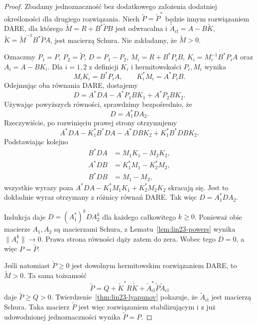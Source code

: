 \begin{proof}
Zbadamy jednoznaczność
bez dodatkowego założenia
dodatniej określoności
dla drugiego rozwiązania.
Niech \(\widetilde P=\widetilde P^*\)
będzie innym rozwiązaniem
DARE, dla którego
\(\widetilde M=R+B^*\widetilde PB\)
jest odwracalna i
\(\widetilde A_{\mathrm{cl}}
 =A-B\widetilde K\),
\(\widetilde K=\widetilde M^{-1}B^*\widetilde PA\),
jest macierzą Schura.
Nie zakładamy, że
\(\widetilde M>0\).

Oznaczmy
\(P_1=P\), \(P_2=\widetilde P\),
\(D=P_1-P_2\),
\(M_i=R+B^*P_iB\),
\(K_i=M_i^{-1}B^*P_iA\)
oraz \(A_i=A-BK_i\).
Dla \(i=1,2\)
z definicji \(K_i\)
i hermitowskości \(P_i,M_i\)
wynika
\[
 M_iK_i=B^*P_iA,\qquad
 K_i^*M_i=A^*P_iB.
\]
Odejmując oba równania DARE,
dostajemy
\[
 D=A^*DA
    -A^*P_1BK_1+A^*P_2BK_2.
\]
Używając powyższych
równości, sprawdzimy
bezpośrednio, że
\[
 D=A_1^*DA_2.
\]
Rzeczywiście, po
rozwinięciu prawej strony
otrzymujemy
\[
 A^*DA-K_1^*B^*DA
 -A^*DBK_2+K_1^*B^*DBK_2.
\]
Podstawiając kolejno
\[
 \begin{aligned}
 B^*DA&=M_1K_1-M_2K_2,\\
 A^*DB&=K_1^*M_1-K_2^*M_2,\\
 B^*DB&=M_1-M_2,
 \end{aligned}
\]
wszystkie wyrazy poza
\(A^*DA-K_1^*M_1K_1+
K_2^*M_2K_2\)
skracają się.
Jest to dokładnie wyraz
otrzymany z różnicy
równań DARE.
Tak więc \(D=A_1^*DA_2\).

Indukcja daje
\(D=(A_1^*)^kDA_2^k\)
dla każdego całkowitego \(k\ge0\).
Ponieważ obie macierze
\(A_1,A_2\) są macierzami Schura,
z Lematu~\ref{lem:lin23-powers}
wynika \(\|A_i^k\|\to0\).
Prawa strona równości
dąży zatem do zera.
Wobec tego \(D=0\),
a więc \(P=\widetilde P\).

Jeśli natomiast
\(\widetilde P\ge0\)
jest dowolnym hermitowskim
rozwiązaniem DARE,
to \(\widetilde M>0\).
Ta sama tożsamość
\[
 \widetilde P
 =Q+\widetilde K^*R\widetilde K+
   \widetilde A_{\mathrm{cl}}^*
      \widetilde P\widetilde A_{\mathrm{cl}}
\]
daje \(\widetilde P\ge Q>0\).
Twierdzenie~\ref{thm:lin23-lyapunov}
pokazuje, że
\(\widetilde A_{\mathrm{cl}}\)
jest macierzą Schura.
Taka macierz \(\widetilde P\)
jest więc rozwiązaniem
stabilizującym i z już
udowodnionej jednoznaczności
wynika \(\widetilde P=P\).
\end{proof}

